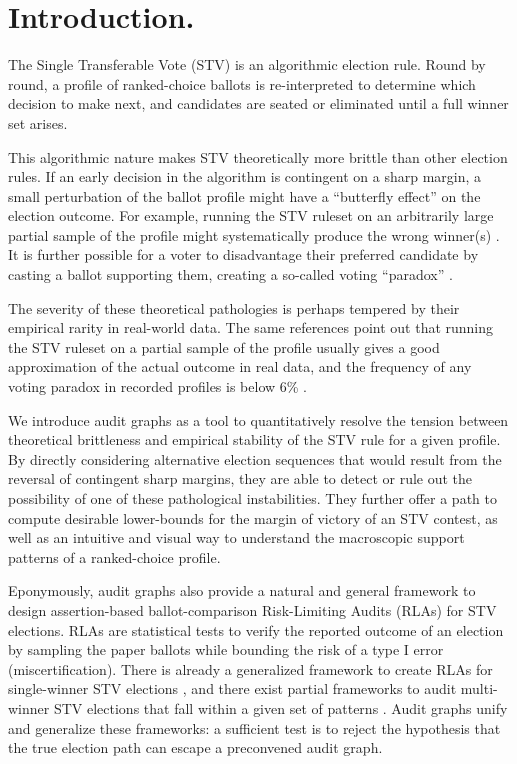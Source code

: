 \section{Introduction.}
The Single Transferable Vote (STV) is an algorithmic election rule. 
Round by round, a profile of ranked-choice ballots is re-interpreted to determine which decision to make next, and candidates are seated or eliminated until a full winner set arises.

This algorithmic nature makes STV theoretically more brittle than other election rules. 
If an early decision in the algorithm is contingent on a sharp margin, a small perturbation of the ballot profile might have a ``butterfly effect'' on the election outcome. 
For example, running the STV ruleset on an arbitrarily large partial sample of the profile might systematically produce the wrong winner(s) \cite{icelandSamplingWinnersRanked2024}. 
It is further possible for a voter to disadvantage their preferred candidate by casting a ballot supporting them, creating a so-called voting ``paradox'' \cite{mccuneMonotonicityAnomaliesScottish2024}.

The severity of these theoretical pathologies is perhaps tempered by their empirical rarity in real-world data.
The same references point out that running the STV ruleset on a partial sample of the profile usually gives a good approximation of the actual outcome in real data, and the frequency of any voting paradox in recorded profiles is below 6\% \cite{icelandSamplingWinnersRanked2024,mccuneMonotonicityAnomaliesScottish2024}.

We introduce audit graphs as a tool to quantitatively resolve the tension between theoretical brittleness and empirical stability of the STV rule for a given profile.
By directly considering alternative election sequences that would result from the reversal of contingent sharp margins, they are able to detect or rule out the possibility of one of these pathological instabilities.
They further offer a path to compute desirable lower-bounds for the margin of victory of an STV contest, as well as an intuitive and visual way to understand the macroscopic support patterns of a ranked-choice profile.

Eponymously, audit graphs also provide a natural and general framework to design assertion-based ballot-comparison Risk-Limiting Audits (RLAs) for STV elections. 
RLAs are statistical tests to verify the reported outcome of an election by sampling the paper ballots while bounding the risk of a type I error (miscertification).
There is already a generalized framework to create RLAs for single-winner STV elections \cite{blomRAIRERiskLimitingAudits2019b}, and there exist partial frameworks to audit multi-winner STV elections that fall within a given set of patterns \cite{blom3+SeatRiskLimiting2026}. 
Audit graphs unify and generalize these frameworks: a sufficient test is to reject the hypothesis that the true election path can escape a preconvened audit graph.
